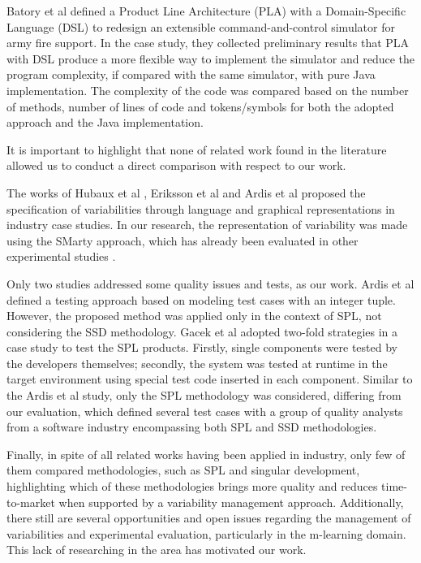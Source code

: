 Batory et al \cite{batory02} defined a Product Line Architecture (PLA) with a Domain-Specific Language (DSL) to redesign an extensible command-and-control simulator for army fire support. In the case study, they collected preliminary results that PLA with DSL produce a more flexible way to implement the simulator and reduce the program complexity, if compared with the same simulator, with pure Java implementation. The complexity of the code was compared based on the number of methods, number of lines of code and tokens/symbols for both the adopted approach and the Java implementation.



It is important to highlight that none of related work found in the literature allowed us to conduct a direct comparison with respect to our work.

The works of Hubaux et al \cite{hubaux10}, Eriksson et al \cite{eriksson09} and Ardis et al \cite{ardis00} proposed the specification of variabilities through language and graphical representations in industry case studies. In our research, the representation of variability was made using the  SMarty approach, which has already been evaluated in other experimental studies \cite{marcolino13,marcolino14a,marcolino14b,bera15,marcolinospl2017}.

Only two studies addressed some quality issues and tests, as our work. Ardis et al \cite{ardis00} defined a testing approach based on modeling test cases with an integer tuple. However, the proposed method was applied only in the context of SPL, not considering the SSD methodology. Gacek et al \cite{gacek01} adopted two-fold strategies in a case study to test the SPL products. Firstly, single components were tested by the developers themselves; secondly, the system was tested at runtime in the target environment using special test code inserted in each component. Similar to the Ardis et al \cite{ardis00} study, only the SPL methodology was considered, differing from our evaluation, which defined several test cases with a group of quality analysts from a software industry encompassing both SPL and SSD methodologies.


Finally, in spite of all related works having been  applied in industry, only few of them compared methodologies, such as SPL and singular development, highlighting which of these methodologies brings more quality and reduces time-to-market when supported by a variability management approach. Additionally, there still are several opportunities and open issues regarding the management of variabilities and experimental evaluation, particularly in the m-learning domain. This lack of researching in the area has motivated our work.